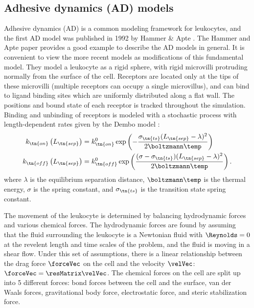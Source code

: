 \subsection{Adhesive dynamics (AD) models}
\label{sec:adhesive-dynamics}

Adhesive dynamics (AD) is a common modeling framework for leukocytes,
and the first AD model was published in 1992 by Hammer \& Apte
\cite{Hammer1992}. The Hammer and Apte paper provides a good example
to describe the AD models in general. It is convenient to view the
more recent models as modifications of this fundamental model. They
model a leukocyte as a rigid sphere, with rigid microvilli protruding
normally from the surface of the cell. Receptors are located only at
the tips of these microvilli (multiple receptors can occupy a single
microvillus), and can bind to ligand binding sites which are uniformly
distributed along a flat wall. The positions and bound state of each
receptor is tracked throughout the simulation. Binding and unbinding
of receptors is modeled with a stochastic process with
length-dependent rates given by the Dembo model \cite{Dembo1988}:
\begin{align}
  \label{eq:dembo-on}
  k_\tn{on} \left(L_\tn{sep}\right)
  &= k_\tn{on}^0 \exp \left( -\frac{\sigma_\tn{ts} (L_\tn{sep} -
    \lambda)^2}{2\boltzmann \temp} \right) \\
  \label{eq:dembo-off}
  k_\tn{off} \left(L_\tn{sep}\right)
  &= k_\tn{off}^0 \exp \left( \frac{(\sigma - \sigma_\tn{ts})
    (L_\tn{sep} - \lambda)^2}{2 \boltzmann \temp} \right).
\end{align}
where $\lambda$ is the equilibrium separation distance,
$\boltzmann\temp$ is the thermal energy, $\sigma$ is the spring
constant, and $\sigma_\tn{ts}$ is the transition state spring
constant.

The movement of the leukocyte is determined by balancing hydrodynamic
forces and various chemical forces. The hydrodynamic forces are found
by assuming that the fluid surrounding the leukocyte is a Newtonian
fluid with $\Reynolds = 0$ at the revelent length and time scales of
the problem, and the fluid is moving in a shear flow. Under this set
of assumptions, there is a linear relationship between the drag force
$\forceVec$ on the cell and the velocity $\velVec$: $\forceVec =
\resMatrix \velVec$. The chemical forces on the cell are split up into
5 different forces: bond forces between the cell and the surface, van
der Waals forces, gravitational body force, electrostatic force, and
steric stabilization force.

